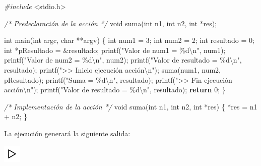 \documentclass[
]{book}
\newenvironment{Shaded}{\begin{snugshade}}{\end{snugshade}}
\newcommand{\CommentTok}[1]{\textcolor[rgb]{0.56,0.35,0.01}{\textit{#1}}}
\newcommand{\ControlFlowTok}[1]{\textcolor[rgb]{0.13,0.29,0.53}{\textbf{#1}}}
\newcommand{\DataTypeTok}[1]{\textcolor[rgb]{0.13,0.29,0.53}{#1}}
\newcommand{\DecValTok}[1]{\textcolor[rgb]{0.00,0.00,0.81}{#1}}
\newcommand{\ImportTok}[1]{#1}
\newcommand{\NormalTok}[1]{#1}
\newcommand{\PreprocessorTok}[1]{\textcolor[rgb]{0.56,0.35,0.01}{\textit{#1}}}
\newcommand{\SpecialCharTok}[1]{\textcolor[rgb]{0.00,0.00,0.00}{#1}}
\newcommand{\StringTok}[1]{\textcolor[rgb]{0.31,0.60,0.02}{#1}}
\begin{document}
\begin{Shaded}
\begin{Highlighting}[]
\PreprocessorTok{\#include }\ImportTok{\textless{}stdio.h\textgreater{}}

\CommentTok{/* Predeclaración de la acción */}
\DataTypeTok{void}\NormalTok{ suma(}\DataTypeTok{int}\NormalTok{ n1, }\DataTypeTok{int}\NormalTok{ n2, }\DataTypeTok{int}\NormalTok{ *res);}

\DataTypeTok{int}\NormalTok{ main(}\DataTypeTok{int}\NormalTok{ argc, }\DataTypeTok{char}\NormalTok{ **argv) \{}
    \DataTypeTok{int}\NormalTok{ num1 = }\DecValTok{3}\NormalTok{;}
    \DataTypeTok{int}\NormalTok{ num2 = }\DecValTok{2}\NormalTok{;}
    \DataTypeTok{int}\NormalTok{ resultado = }\DecValTok{0}\NormalTok{;}
    \DataTypeTok{int}\NormalTok{ *pResultado = \&resultado;}
\NormalTok{    printf(}\StringTok{"Valor de num1 = \%d}\SpecialCharTok{\textbackslash{}n}\StringTok{"}\NormalTok{, num1);}
\NormalTok{    printf(}\StringTok{"Valor de num2 = \%d}\SpecialCharTok{\textbackslash{}n}\StringTok{"}\NormalTok{, num2);}
\NormalTok{    printf(}\StringTok{"Valor de resultado = \%d}\SpecialCharTok{\textbackslash{}n}\StringTok{"}\NormalTok{, resultado);}
\NormalTok{    printf(}\StringTok{"\textgreater{}\textgreater{} Inicio ejecución acción}\SpecialCharTok{\textbackslash{}n}\StringTok{"}\NormalTok{); }
\NormalTok{    suma(num1, num2, pResultado);}
\NormalTok{    printf(}\StringTok{"Suma = \%d}\SpecialCharTok{\textbackslash{}n}\StringTok{"}\NormalTok{, resultado);}
\NormalTok{    printf(}\StringTok{"\textgreater{}\textgreater{} Fin ejecución acción}\SpecialCharTok{\textbackslash{}n}\StringTok{"}\NormalTok{);}
\NormalTok{    printf(}\StringTok{"Valor de resultado = \%d}\SpecialCharTok{\textbackslash{}n}\StringTok{"}\NormalTok{, resultado);}
    \ControlFlowTok{return} \DecValTok{0}\NormalTok{;}
\NormalTok{\}}

\CommentTok{/* Implementación de la acción */}
\DataTypeTok{void}\NormalTok{ suma(}\DataTypeTok{int}\NormalTok{ n1, }\DataTypeTok{int}\NormalTok{ n2, }\DataTypeTok{int}\NormalTok{ *res) \{}
\NormalTok{    *res = n1 + n2;}
\NormalTok{\}}
\end{Highlighting}
\end{Shaded}

La ejecución generará la siguiente salida:

\includegraphics{./img/play.png}
\end{document}
